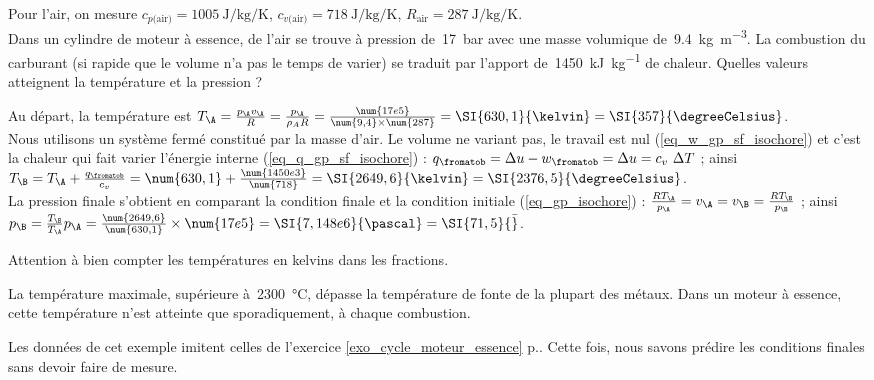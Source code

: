 		\begin{anexample}
			Pour l’air, on mesure $c_{p\text{(air)}} = \SI{1005}{\joule\per\kilogram\per\kelvin}$, $c_{v\text{(air)}} = \SI{718}{\joule\per\kilogram\per\kelvin}$, $R_\text{air} = \SI{287}{\joule\per\kilogram\per\kelvin}$.\\
			Dans un cylindre de moteur à essence, de l’air se trouve à pression de~\SI{17}{\bar} avec une masse volumique de~\SI{9,4}{\kilogram\per\metre\cubed}. La combustion du carburant (si rapide que le volume n’a pas le temps de varier) se traduit par l’apport de~\SI{1450}{\kilo\joule\per\kilogram} de chaleur. Quelles valeurs atteignent la température et la pression ?
				\begin{answer}
					Au départ, la température est $T_\A = \frac{p_\A v_\A}{R} = \frac{p_\A}{\rho_A R} = \frac{\num{17e5}}{\num{9,4} \times \num{287}} = \SI{630,1}{\kelvin} = \SI{357}{\degreeCelsius}$.\\
					Nous utilisons un système fermé constitué par la masse d’air. Le volume ne variant pas, le travail est nul (\ref{eq_w_gp_sf_isochore}) et c’est la chaleur qui fait varier l’énergie interne (\ref{eq_q_gp_sf_isochore}) : $q_\fromatob = \Delta u - w_\fromatob = \Delta u = c_v \ \Delta T$ ; ainsi $T_\B = T_\A + \frac{q_\fromatob}{c_v} = \num{630,1} + \frac{\num{1450e3}}{\num{718}} = \SI{2649,6}{\kelvin} = \SI{2376,5}{\degreeCelsius}$.\\
					La pression finale s’obtient en comparant la condition finale et la condition initiale (\ref{eq_gp_isochore}) : $\frac{R T_\A}{p_\A} = v_\A = v_\B = \frac{R T_\B}{p_\B} $ ; ainsi $p_\B = \frac{T_\B}{T_\A} p_\A = \frac{\num{2649,6}}{\num{630,1}} \times \num{17e5} = \SI{7,148e6}{\pascal} = \SI{71,5}{\bar}$.
						\begin{remark}Attention à bien compter les températures en \si{kelvins} dans les fractions.\end{remark}
						\begin{remark}La température maximale, supérieure à~\SI{2300}{\degreeCelsius}, dépasse la température de fonte de la plupart des métaux. Dans un moteur à essence, cette température n’est atteinte que sporadiquement, à chaque combustion.\end{remark}
						\begin{remark}Les données de cet exemple imitent celles de l’exercice \ref{exo_cycle_moteur_essence} p.\pageref{exo_cycle_moteur_essence}. Cette fois, nous savons prédire les conditions finales sans devoir faire de mesure.\end{remark}
				\end{answer}
		\end{anexample}

